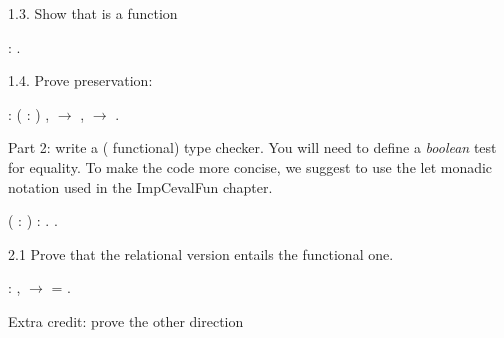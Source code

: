 \documentclass[12pt]{report}
\begin{document}
 1.3. Show that  is a   function
\begin{coqdoccode}
\coqdocemptyline
\coqdocnoindent
{} :  .\coqdoceol
\coqdocemptyline
\end{coqdoccode}
1.4. Prove preservation: 
\begin{coqdoccode}
\coqdocemptyline
\coqdocnoindent
{}  : \coqdockw{\ensuremath{\forall}} (  : ) ,\coqdoceol
\coqdocindent{1.00em}
   \ensuremath{\rightarrow} \coqdockw{\ensuremath{\forall}} ,\coqdoceol
\coqdocindent{1.00em}
   \ensuremath{\rightarrow}\coqdoceol
\coqdocindent{1.00em}
  .\coqdoceol
\coqdocemptyline
\end{coqdoccode}
Part 2: write a ( functional) type checker. You will need to define
a \textit{boolean} test for  equality. To make the code more concise, we suggest
 to use the let monadic notation used in the ImpCevalFun chapter. 
\begin{coqdoccode}
\coqdocemptyline
\coqdocindent{0.50em}
  \coqdoceol
\coqdocindent{2.50em}
( : ) :   .\coqdoceol
\coqdocindent{0.50em}
.\coqdoceol
\coqdocemptyline
\end{coqdoccode}
2.1 Prove that the relational version entails the functional one. 
\begin{coqdoccode}
\coqdocemptyline
\coqdocindent{0.50em}
 : \coqdockw{\ensuremath{\forall}}  ,    \ensuremath{\rightarrow}   =  .\coqdoceol
\coqdocemptyline
\end{coqdoccode}
Extra credit: prove the other direction
\begin{coqdoccode}
\coqdocemptyline
\coqdocemptyline
\end{coqdoccode}
\end{document}
